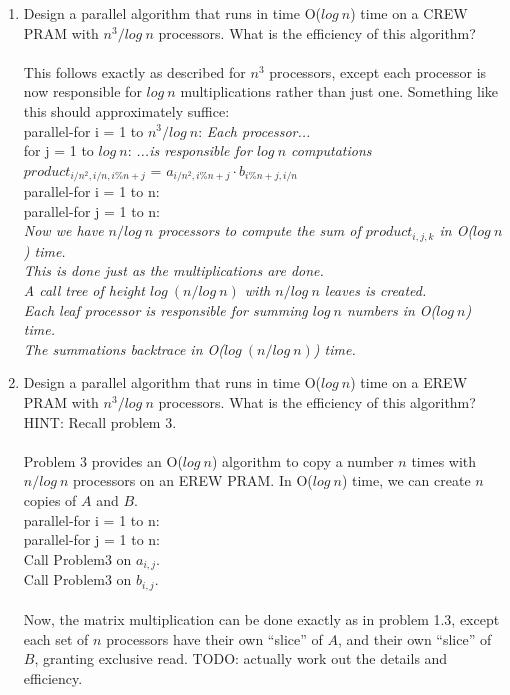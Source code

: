 \documentclass[10pt]{article}
\newcommand{\tab}{\hspace*{2em}}
\newcommand{\tabb}{\hspace*{4em}}
\begin{document}
\begin{enumerate}
\item Design a parallel algorithm that runs in time O($log~n$) time on a CREW PRAM with $n^3/log~n$
processors. What is the efficiency of this algorithm?\\
\\
This follows exactly as described for $n^3$ processors, except each processor is now responsible for
$log~n$ multiplications rather than just one. Something like this should approximately suffice:\\
parallel-for i = 1 to $n^3/log~n$: \emph{Each processor...}\\
\tab for j = 1 to $log~n$: \emph{...is responsible for $log~n$ computations}\\
\tabb $product_{i/n^2,i/n,i\%{n}+j}$ = $a_{i/n^2,i\%{n}+j} \cdot b_{i\%{n}+j,i/n}$\\
parallel-for i = 1 to n:\\
\tab parallel-for j = 1 to n:\\
\tabb \emph{Now we have $n/log~n$ processors to compute the sum of $product_{i,j,k}$ in O($log~n$) time.}\\
\tabb \emph{This is done just as the multiplications are done.}\\
\tabb \emph{A call tree of height $log~(n/log~n)$ with $n/log~n$ leaves is created.}\\
\tabb \emph{Each leaf processor is responsible for summing $log~n$ numbers in O($log~n$) time.}\\
\tabb \emph{The summations backtrace in O($log~(n/log~n)$) time.}\\
            
\item Design a parallel algorithm that runs in time O($log~n$) time on a EREW PRAM with $n^3/log~n$
processors. What is the efficiency of this algorithm? HINT: Recall problem 3.\\
\\
Problem 3 provides an O($log~n$) algorithm to copy a number $n$ times with $n/log~n$ processors on an EREW PRAM.
In O($log~n$) time, we can create $n$ copies of $A$ and $B$.\\
parallel-for i = 1 to n:\\
\tab parallel-for j = 1 to n:\\
\tabb Call Problem3 on $a_{i,j}$.\\
\tabb Call Problem3 on $b_{i,j}$.\\
\\
Now, the matrix multiplication can be done exactly as in problem 1.3, except each set of $n$ processors have their
own ``slice'' of $A$, and their own ``slice'' of $B$, granting exclusive read.
TODO: actually work out the details and efficiency.
\end{enumerate}
\end{document}
